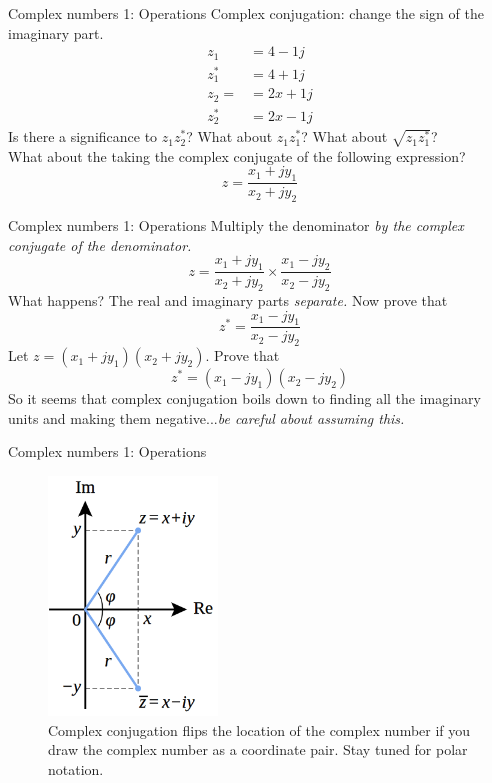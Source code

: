 \documentclass{beamer}
\begin{document}
\begin{frame}{Complex numbers 1: Operations}
Complex conjugation: change the sign of the imaginary part.
\begin{align}
z_1 &= 4-1j \\
z_1^* &= 4+1j \\
z_2 = &= 2x + 1j \\
z_2^* &= 2x - 1j
\end{align}
Is there a significance to $z_1 z_2^*$?  What about $z_1 z_1^*$?  What about $\sqrt{z_1 z_1^*}$? \\ \vspace{0.5cm}
What about the taking the complex conjugate of the following expression?
\begin{equation}
z = \frac{x_1 + jy_1}{x_2 + j y_2}
\end{equation}
\end{frame}

\begin{frame}{Complex numbers 1: Operations}
Multiply the denominator \textit{by the complex conjugate of the denominator.}
\begin{equation}
z = \frac{x_1 + jy_1}{x_2 + j y_2} \times \frac{x_1-j y_2}{x_2-j y_2}
\end{equation}
What happens?  The real and imaginary parts \textit{separate.}  Now prove that
\begin{equation}
z^* = \frac{x_1 - jy_1}{x_2 - j y_2}
\end{equation}
Let $z = (x_1+jy_1)(x_2+jy_2)$.  Prove that
\begin{equation}
z^* = (x_1 - jy_1)(x_2-jy_2)
\end{equation}
So it seems that complex conjugation boils down to finding all the imaginary units and making them negative...\textit{be careful about assuming this.}
\end{frame}

\begin{frame}{Complex numbers 1: Operations}
\begin{figure}
\centering
\includegraphics[width=0.4\textwidth]{figures/cc.png}
\caption{\label{fig:complex2a} Complex conjugation flips the location of the complex number if you draw the complex number as a coordinate pair.  Stay tuned for \alert{polar notation}.}
\end{figure}
\end{frame}
\end{document}
